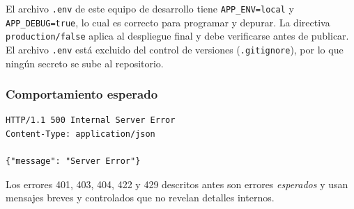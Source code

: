 \begin{aviso}
El archivo \texttt{.env} de este equipo de desarrollo tiene \texttt{APP\_ENV=local} y \texttt{APP\_DEBUG=true}, lo cual es correcto para programar y depurar. La directiva \texttt{production/false} aplica al despliegue final y debe verificarse antes de publicar. El archivo \texttt{.env} está excluido del control de versiones (\texttt{.gitignore}), por lo que ningún secreto se sube al repositorio.
\end{aviso}

\subsubsection{Comportamiento esperado}
\begin{lstlisting}[language={}, caption={Respuesta de error en producción}]
HTTP/1.1 500 Internal Server Error
Content-Type: application/json

{"message": "Server Error"}
\end{lstlisting}
Los errores 401, 403, 404, 422 y 429 descritos antes son errores \emph{esperados} y usan mensajes breves y controlados que no revelan detalles internos.
